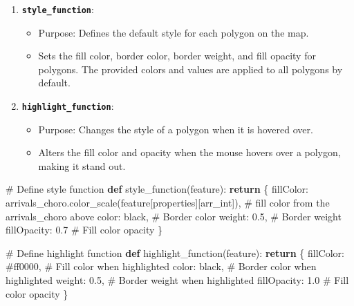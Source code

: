 \documentclass[
  letterpaper,
  DIV=11,
  numbers=noendperiod]{scrreprt}
\newenvironment{Shaded}{\begin{snugshade}}{\end{snugshade}}
\newcommand{\CommentTok}[1]{\textcolor[rgb]{0.37,0.37,0.37}{#1}}
\newcommand{\ControlFlowTok}[1]{\textcolor[rgb]{0.00,0.23,0.31}{\textbf{#1}}}
\newcommand{\FloatTok}[1]{\textcolor[rgb]{0.68,0.00,0.00}{#1}}
\newcommand{\KeywordTok}[1]{\textcolor[rgb]{0.00,0.23,0.31}{\textbf{#1}}}
\newcommand{\NormalTok}[1]{\textcolor[rgb]{0.00,0.23,0.31}{#1}}
\newcommand{\StringTok}[1]{\textcolor[rgb]{0.13,0.47,0.30}{#1}}
\providecommand{\tightlist}{%
  \setlength{\itemsep}{0pt}\setlength{\parskip}{0pt}}\usepackage{longtable,booktabs,array}
\begin{document}
\begin{enumerate}
\def\labelenumi{\arabic{enumi}.}
\tightlist
\item
  \textbf{\texttt{style\_function}}:

  \begin{itemize}
  \tightlist
  \item
    Purpose: Defines the default style for each polygon on the map.
  \item
    Sets the fill color, border color, border weight, and fill opacity
    for polygons. The provided colors and values are applied to all
    polygons by default.
  \end{itemize}
\item
  \textbf{\texttt{highlight\_function}}:

  \begin{itemize}
  \tightlist
  \item
    Purpose: Changes the style of a polygon when it is hovered over.
  \item
    Alters the fill color and opacity when the mouse hovers over a
    polygon, making it stand out.
  \end{itemize}
\end{enumerate}

\begin{Shaded}
\begin{Highlighting}[]
\CommentTok{\# Define style function}
\KeywordTok{def}\NormalTok{ style\_function(feature):}
    \ControlFlowTok{return}\NormalTok{ \{}
        \StringTok{\textquotesingle{}fillColor\textquotesingle{}}\NormalTok{: arrivals\_choro.color\_scale(feature[}\StringTok{\textquotesingle{}properties\textquotesingle{}}\NormalTok{][}\StringTok{\textquotesingle{}arr\_int\textquotesingle{}}\NormalTok{]),  }\CommentTok{\# fill color from the arrivals\_choro above}
        \StringTok{\textquotesingle{}color\textquotesingle{}}\NormalTok{: }\StringTok{\textquotesingle{}black\textquotesingle{}}\NormalTok{,  }\CommentTok{\# Border color}
        \StringTok{\textquotesingle{}weight\textquotesingle{}}\NormalTok{: }\FloatTok{0.5}\NormalTok{, }\CommentTok{\# Border weight}
        \StringTok{\textquotesingle{}fillOpacity\textquotesingle{}}\NormalTok{: }\FloatTok{0.7} \CommentTok{\# Fill color opacity }
\NormalTok{    \}}

\CommentTok{\# Define highlight function}
\KeywordTok{def}\NormalTok{ highlight\_function(feature):}
    \ControlFlowTok{return}\NormalTok{ \{}
        \StringTok{\textquotesingle{}fillColor\textquotesingle{}}\NormalTok{: }\StringTok{\textquotesingle{}\#ff0000\textquotesingle{}}\NormalTok{,  }\CommentTok{\# Fill color when highlighted}
        \StringTok{\textquotesingle{}color\textquotesingle{}}\NormalTok{: }\StringTok{\textquotesingle{}black\textquotesingle{}}\NormalTok{,  }\CommentTok{\# Border color when highlighted}
        \StringTok{\textquotesingle{}weight\textquotesingle{}}\NormalTok{: }\FloatTok{0.5}\NormalTok{, }\CommentTok{\# Border weight when highlighted}
        \StringTok{\textquotesingle{}fillOpacity\textquotesingle{}}\NormalTok{: }\FloatTok{1.0} \CommentTok{\# Fill color opacity }
\NormalTok{    \}}
\end{Highlighting}
\end{Shaded}
\end{document}
